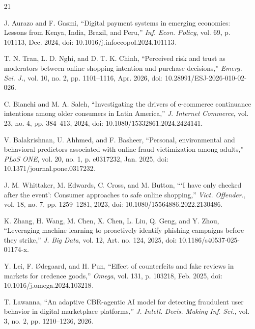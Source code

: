 \begin{thebibliography}{21}

 J. Aurazo and F. Gasmi, ``Digital payment systems in emerging economies: Lessons from Kenya, India, Brazil, and Peru,'' \textit{Inf. Econ. Policy}, vol. 69, p. 101113, Dec. 2024, doi: 10.1016/j.infoecopol.2024.101113.

 T. N. Tran, L. D. Nghi, and D. T. K. Chinh, ``Perceived risk and trust as moderators between online shopping intention and purchase decisions,'' \textit{Emerg. Sci. J.}, vol. 10, no. 2, pp. 1101--1116, Apr. 2026, doi: 10.28991/ESJ-2026-010-02-026.

 C. Bianchi and M. A. Saleh, ``Investigating the drivers of e-commerce continuance intentions among older consumers in Latin America,'' \textit{J. Internet Commerce}, vol. 23, no. 4, pp. 384--413, 2024, doi: 10.1080/15332861.2024.2424141.

 V. Balakrishnan, U. Ahhmed, and F. Basheer, ``Personal, environmental and behavioral predictors associated with online fraud victimization among adults,'' \textit{PLoS ONE}, vol. 20, no. 1, p. e0317232, Jan. 2025, doi: 10.1371/journal.pone.0317232.

 J. M. Whittaker, M. Edwards, C. Cross, and M. Button, ```I have only checked after the event': Consumer approaches to safe online shopping,'' \textit{Vict. Offender.}, vol. 18, no. 7, pp. 1259--1281, 2023, doi: 10.1080/15564886.2022.2130486.

 K. Zhang, H. Wang, M. Chen, X. Chen, L. Liu, Q. Geng, and Y. Zhou, ``Leveraging machine learning to proactively identify phishing campaigns before they strike,'' \textit{J. Big Data}, vol. 12, Art. no. 124, 2025, doi: 10.1186/s40537-025-01174-x.

 Y. Lei, F. \O degaard, and H. Pun, ``Effect of counterfeits and fake reviews in markets for credence goods,'' \textit{Omega}, vol. 131, p. 103218, Feb. 2025, doi: 10.1016/j.omega.2024.103218.

 T. Lawanna, ``An adaptive CBR-agentic AI model for detecting fraudulent user behavior in digital marketplace platforms,'' \textit{J. Intell. Decis. Making Inf. Sci.}, vol. 3, no. 2, pp. 1210--1236, 2026.


\end{thebibliography}
